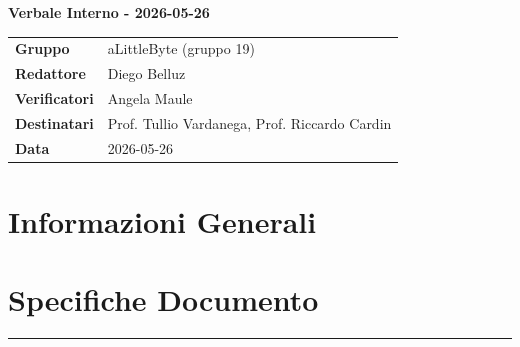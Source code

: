 \documentclass[a4paper,12pt]{article}
\begin{document}
\thispagestyle{firstpage}

\vspace*{0.5cm}

\begin{center}
    {\LARGE \textbf{Verbale Interno - 2026-05-26}}
\end{center}

\vspace{1.5cm}

\begin{center}
    \renewcommand{\arraystretch}{1.3}
    \begin{tcolorbox}[
        width=0.92\textwidth,
        colback=gray!6,
        colframe=gray!45,
        boxrule=0.5pt,
        arc=2mm,
        boxsep=0pt,
        left=8pt, right=8pt, top=8pt, bottom=8pt
    ]
        \begin{tabularx}{\linewidth}{>{\bfseries}p{3.5cm} X}
            Gruppo      & aLittleByte (gruppo 19) \\
            Redattore   & Diego Belluz \\
            Verificatori & Angela Maule\\
            Destinatari & Prof. Tullio Vardanega, Prof. Riccardo Cardin \\
            Data        & 2026-05-26\\
        \end{tabularx}
    \end{tcolorbox}
\end{center}

\newpage

\tableofcontents
\newpage
\section{Informazioni Generali}
\section*{Specifiche Documento}
\hrule
\vspace{1cm}
\end{document}
